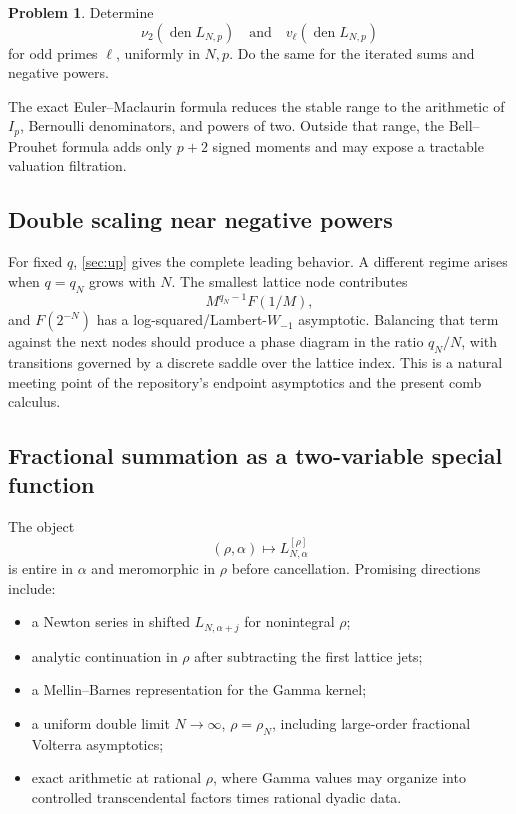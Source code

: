 \documentclass[11pt,oneside]{article}
\numberwithin{equation}{section}
\theoremstyle{definition}
\newtheorem{problem}[theorem]{Problem}
\theoremstyle{remark}
\newcommand{\vtwo}{\nu_2}
\begin{document}
\begin{problem}
\label{prob:sharp-valuations}
Determine
\begin{equation}
 \vtwo\!\left(\operatorname{den}L_{N,p}\right)
 \quad\text{and}\quad
 v_\ell\!\left(\operatorname{den}L_{N,p}\right)
 \label{eq:valuation-problem}
\end{equation}
for odd primes \(\ell\), uniformly in \(N,p\).  Do the same for the iterated sums and
negative powers.
\end{problem}
The exact Euler--Maclaurin formula reduces the stable range to the arithmetic of
\(I_p\), Bernoulli denominators, and powers of two.  Outside that range, the Bell--Prouhet
formula adds only \(p+2\) signed moments and may expose a tractable valuation filtration.

\subsection{Double scaling near negative powers}

For fixed \(q\), \cref{sec:up} gives the complete leading behavior.  A different regime
arises when \(q=q_N\) grows with \(N\).  The smallest lattice node contributes
\begin{equation}
 M^{q_N-1}F(1/M),
 \label{eq:smallest-node}
\end{equation}
and \(F(2^{-N})\) has a log-squared/Lambert-\(W_{-1}\) asymptotic.  Balancing that term
against the next nodes should produce a phase diagram in the ratio \(q_N/N\), with
transitions governed by a discrete saddle over the lattice index.  This is a natural
meeting point of the repository's endpoint asymptotics and the present comb calculus.

\subsection{Fractional summation as a two-variable special function}

The object
\begin{equation}
 (\rho,\alpha)\longmapsto L_{N,\alpha}^{[\rho]}
 \label{eq:two-var-special}
\end{equation}
is entire in \(\alpha\) and meromorphic in \(\rho\) before cancellation.  Promising
directions include:
\begin{itemize}
\item a Newton series in shifted \(L_{N,\alpha+j}\) for nonintegral \(\rho\);
\item analytic continuation in \(\rho\) after subtracting the first lattice jets;
\item a Mellin--Barnes representation for the Gamma kernel;
\item a uniform double limit \(N\to\infty\), \(\rho=\rho_N\), including large-order
      fractional Volterra asymptotics;
\item exact arithmetic at rational \(\rho\), where Gamma values may organize into
      controlled transcendental factors times rational dyadic data.
\end{itemize}
\end{document}
